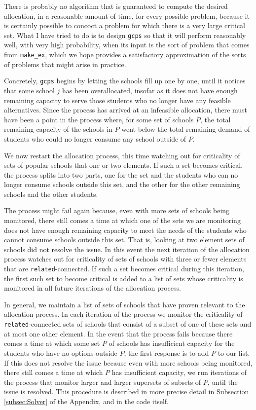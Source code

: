 \documentclass[12pt]{article}
\theoremstyle{definition}
\begin{document}
There is probably no algorithm that is guaranteed to compute the
desired allocation, in a reasonable amount of time, for every possible
problem, because it is certainly possible to concoct a problem for
which there is a very large critical set.  What I have tried to do is
to design \texttt{gcps} so that it will perform reasonably well, with
very high probability, when its input is the sort of problem that
comes from \texttt{make\_ex}, which we hope provides a satisfactory
approximation of the sorts of problems that might arise in practice.

Concretely, \texttt{gcps} begins by letting the schools fill up one by
one, until it notices that some school $j$ has been overallocated,
insofar as it does not have enough remaining capacity to serve those
students who no longer have any feasible alternatives.  Since the
process has arrived at an infeasible allocation, there must have been
a point in the process where, for some set of schools $P$, the total
remaining capacity of the schools in $P$ went below the total
remaining demand of students who could no longer consume any school
outside of $P$.

We now restart the allocation process, this time watching out for
criticality of sets of popular schools that one or two elements.  If
such a set becomes critical, the process splits into two parts, one
for the set and the students who can no longer consume schools outside
this set, and the other for the other remaining schools and the other
students. 

The process might fail again because, even with more sets of schools
being monitored, there still comes a time at which one of the sets we
are monitoring does not have enough remaining capacity to meet the
needs of the students who cannot consume schools outside this set.
That is, looking at two element sets of schools did not resolve the
issue.  In this event the next iteration of the allocation process
watches out for criticality of sets of schools with three or fewer
elements that are \texttt{related}-connected. If such a set becomes
critical during this iteration, the first such set to become critical
is added to a list of sets whose criticality is monitored in all
future iterations of the allocation process.

In general, we maintain a list of sets of schools that have proven
relevant to the allocation process.  In each iteration of the process
we monitor the criticality of \texttt{related}-connected sets of
schools that consist of a subset of one of these sets and at most one
other element.  In the event that the process fails because there
comes a time at which some set $P$ of schools has insufficient
capacity for the students who have no options outside $P$, the first
response is to add $P$ to our list.  If this does not resolve the
issue because even with more schools being monitored, there still
comes a time at which $P$ has insufficient capacity, we run iterations
of the process that monitor larger and larger supersets of subsets of
$P$, until the issue is resolved.  This procedure is described in more
precise detail in Subsection \ref{subsec:Solver} of the Appendix, and
in the code itself.
\end{document}
